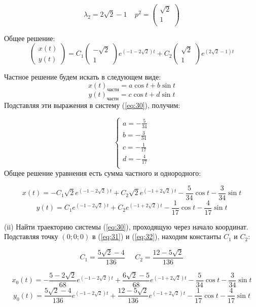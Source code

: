 \documentclass[a4paper, 12pt]{article}
\begin{document}
\[\lambda_2=2\sqrt 2-1\;\;\;\; p^2=
\left(
\begin{array}{cc}
\sqrt 2\\
1\\
\end{array}
\right) 
\]

Общее решение:
\[\left(
\begin{array}{c}
x(t)\\
y(t)
\end{array}
\right)=C_1\left(
\begin{array}{c}
-\sqrt 2 \\
1
\end{array}
\right)e^{(-1-2\sqrt 2)t}+C_2\left(
\begin{array}{c}
\sqrt 2 \\
1
\end{array}
\right)e^{(2\sqrt 2-1)t}\]

Частное решение будем искать в следующем виде:
\[x(t)_{\text{частн}}=a\cos{t}+b\sin{t}\]
\[y(t)_{\text{частн}}=c\cos{t}+d\sin{t}\]
Подставляя эти выражения в систему (\ref{eq:30}), получим:

\[
\left\{
\begin{array}{lr}
a = -\frac {5} {34}\\
b = -\frac {3} {34}\\
c = -\frac {1} {17}\\
d = -\frac {4} {17}\\
\end{array}
\right.
\]
Общее решение уравнения есть сумма частного и однородного:

\begin{equation}
x(t) = -C_1\sqrt 2 e^{(-1-2\sqrt 2)t}+C_2\sqrt 2 e^{(-1+2\sqrt 2)t} -\frac {5} {34}\cos{t}-\frac {3} {34}\sin{t}
\label{eq:31}
\end{equation}
\begin{equation}
y(t) =C_1 e^{(-1-2\sqrt 2)t}+C_2 e^{(-1+2\sqrt 2)t} -\frac {1} {17}\cos{t}-\frac {4} {17}\sin{t}
\label{eq:32}
\end{equation}

(ii) Найти траекторию системы (\ref{eq:30}), проходящую через начало координат.\\
Подставляя точку $(0;0;0)$ в (\ref{eq:31}) и (\ref{eq:32}), находим константы $C_1$ и $C_2$:

\[C_1 = \frac{5\sqrt{2}-4}{136}\;\;\;\;\; C_2 = \frac{12- 5\sqrt{2}}{136}\]

\[
x_0(t) = -\frac{5-2\sqrt{2}}{68} e^{(-1-2\sqrt 2)t}+\frac{6\sqrt{2}- 5}{68} e^{(-1+2\sqrt 2)t} -\frac {5} {34}\cos{t}-\frac {3} {34}\sin{t}
\]\[
y_0(t) = \frac{5\sqrt{2}-4}{136} e^{(-1-2\sqrt 2)t}+\frac{12- 5\sqrt{2}}{136}e^{(-1+2\sqrt 2)t} -\frac {1} {17}\cos{t}-\frac {4} {17}\sin{t}
\]
\end{document}
